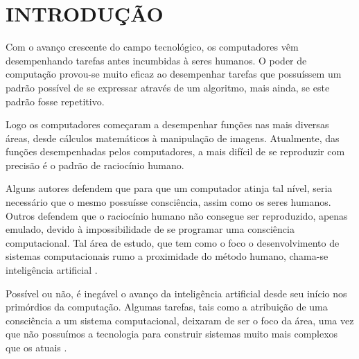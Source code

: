 \documentclass[12pt, openright, oneside, a4paper, brazil]{abntex2}
\begin{document}
\newpage %
\listofquadros* %
\cleardoublepage

\listoffigures*
\cleardoublepage

%
%

\tableofcontents*
\textual

\chapter{INTRODUÇÃO}

Com o avanço crescente do campo tecnológico, os computadores vêm desempenhando tarefas antes incumbidas à seres humanos. O poder de computação provou-se muito eficaz ao desempenhar tarefas que possuíssem um padrão possível de se expressar através de um algoritmo, mais ainda, se este padrão fosse repetitivo.

Logo os computadores começaram a desempenhar funções nas mais diversas áreas, desde cálculos matemáticos à manipulação de imagens. Atualmente, das funções desempenhadas pelos computadores, a mais difícil de se reproduzir com precisão é o padrão de raciocínio humano.

Alguns autores defendem que para que um computador atinja tal nível, seria necessário que o mesmo possuísse consciência, assim como os seres humanos. Outros defendem que o raciocínio humano não consegue ser reproduzido, apenas emulado, devido à impossibilidade de se programar uma consciência computacional. Tal área de estudo, que tem como o foco o desenvolvimento de sistemas computacionais rumo a proximidade do método humano, chama-se inteligência artificial \cite{russell2004inteligencia, coppin2015inteligencia}.

Possível ou não, é inegável o avanço da inteligência artificial desde seu início nos primórdios da computação. Algumas tarefas, tais como a atribuição de uma consciência a um sistema computacional, deixaram de ser o foco da área, uma vez que não possuímos a tecnologia para construir sistemas muito mais complexos que os atuais  \cite{russell2004inteligencia}.
\end{document}
